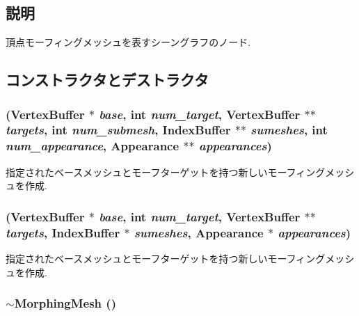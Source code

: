 \subsection{説明}
頂点モーフィングメッシュを表すシーングラフのノード. 

\subsection{コンストラクタとデストラクタ}
\hypertarget{classm3g_1_1MorphingMesh_34180323c022d357e1d9b55e4df5c544}{
\subsubsection[{MorphingMesh}]{ ({\bf VertexBuffer} $\ast$ {\em base}, \/  int {\em num\_\-target}, \/  {\bf VertexBuffer} $\ast$$\ast$ {\em targets}, \/  int {\em num\_\-submesh}, \/  {\bf IndexBuffer} $\ast$$\ast$ {\em sumeshes}, \/  int {\em num\_\-appearance}, \/  {\bf Appearance} $\ast$$\ast$ {\em appearances})}}
\label{classm3g_1_1MorphingMesh_34180323c022d357e1d9b55e4df5c544}


指定されたベースメッシュとモーフターゲットを持つ新しいモーフィングメッシュを作成. \hypertarget{classm3g_1_1MorphingMesh_7b950b24923a93c59542954caff0b00c}{
\subsubsection[{MorphingMesh}]{ ({\bf VertexBuffer} $\ast$ {\em base}, \/  int {\em num\_\-target}, \/  {\bf VertexBuffer} $\ast$$\ast$ {\em targets}, \/  {\bf IndexBuffer} $\ast$ {\em sumeshes}, \/  {\bf Appearance} $\ast$ {\em appearances})}}
\label{classm3g_1_1MorphingMesh_7b950b24923a93c59542954caff0b00c}


指定されたベースメッシュとモーフターゲットを持つ新しいモーフィングメッシュを作成. \hypertarget{classm3g_1_1MorphingMesh_cdafafba64a0167f28f3b66ac4b9d7d6}{
\subsubsection[{$\sim$MorphingMesh}]{\setlength{\rightskip}{0pt plus 5cm}$\sim${\bf MorphingMesh} ()}}
\label{classm3g_1_1MorphingMesh_cdafafba64a0167f28f3b66ac4b9d7d6}


